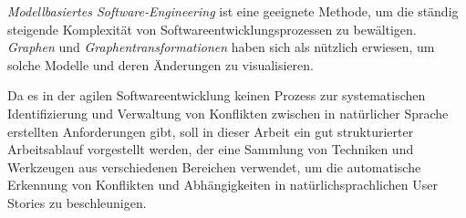 \emph{Modellbasiertes Software-Engineering} ist eine geeignete Methode, um die ständig steigende Komplexität von Softwareentwicklungsprozessen zu bewältigen. \emph{Graphen} und \emph{Graphentransformationen} haben sich als nützlich erwiesen, um solche Modelle und deren Änderungen zu visualisieren.

Da es in der agilen Softwareentwicklung keinen Prozess zur systematischen Identifizierung und Verwaltung von Konflikten zwischen in natürlicher Sprache erstellten Anforderungen gibt, soll in dieser Arbeit ein gut strukturierter Arbeitsablauf vorgestellt werden, der eine Sammlung von Techniken und Werkzeugen aus verschiedenen Bereichen verwendet, um die automatische Erkennung von Konflikten und Abhängigkeiten in natürlichsprachlichen User Stories zu beschleunigen.


